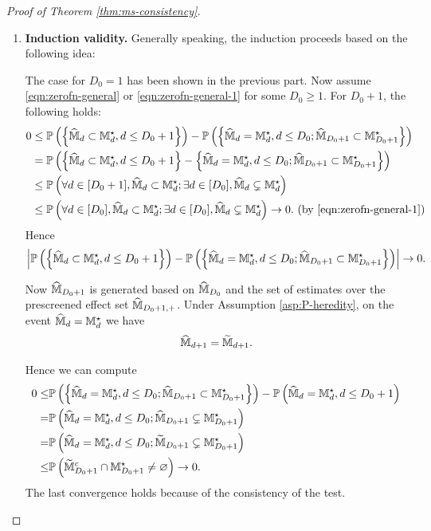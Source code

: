 \documentclass[12pt]{article}
\begin{document}
{\begin{proof}[Proof of Theorem \ref{thm:ms-consistency}]
\begin{enumerate}
    
    
    \item \textbf{Induction validity.}
    Generally speaking, the induction proceeds based on the following idea:
    

    
    The case for $D_0=1$ has been shown in the previous part. Now assume \eqref{eqn:zerofn-general} or \eqref{eqn:zerofn-general-1} for some $D_0\ge1$.  For $D_0+1$, 
    the following holds:
    \begin{align*} 
        0&\le {\mathbb{P}}\left(\left\{\widehat{{\mathbb{M}}}_d\subset{\mathbb{M}}^\star_d, d\le D_0+1\right\}\right)-{\mathbb{P}}\left(\left\{\widehat{{\mathbb{M}}}_d={\mathbb{M}}^\star_d, d\le D_0; \widehat{{\mathbb{M}}}_{D_0+1}\subset{\mathbb{M}}^\star_{D_0+1}\right\}\right) \\
        &= {\mathbb{P}}\left(\left\{\widehat{{\mathbb{M}}}_d\subset{\mathbb{M}}^\star_d, d\le D_0+1\right\} - \left\{\widehat{{\mathbb{M}}}_d={\mathbb{M}}^\star_d, d\le D_0; \widehat{{\mathbb{M}}}_{D_0+1}\subset{\mathbb{M}}^\star_{D_0+1}\right\}\right)\notag\\
        &\le {\mathbb{P}}\left(\forall d\in[D_0+1], \widehat{{\mathbb{M}}}_{d}\subset{\mathbb{M}}^\star_{d}; \exists d\in[D_0], \widehat{{\mathbb{M}}}_d\subsetneq{\mathbb{M}}^\star_d\right)\notag\\
        &\le {\mathbb{P}}\left(\forall d\in[D_0], \widehat{{\mathbb{M}}}_{d}\subset{\mathbb{M}}^\star_{d};\exists d\in[D_0], \widehat{{\mathbb{M}}}_d\subsetneq{\mathbb{M}}^\star_d\right)\to 0.\text{ (by \eqref{eqn:zerofn-general-1})}
    \end{align*}
    Hence
    \begin{align}\label{eqn:zerofun-general-2}
        \left|{\mathbb{P}}\left(\left\{\widehat{{\mathbb{M}}}_d\subset{\mathbb{M}}^\star_d, d\le D_0+1\right\}\right) - 
        {\mathbb{P}}\left(\left\{\widehat{{\mathbb{M}}}_d={\mathbb{M}}^\star_d, d\le D_0; \widehat{{\mathbb{M}}}_{D_0+1}\subset{\mathbb{M}}^\star_{D_0+1}\right\}\right)\right| \to 0.
    \end{align}
    
    Now $\widehat{{\mathbb{M}}}_{D_0+1}$ is generated based on $\widehat{{\mathbb{M}}}_{D_0}$ and the set of estimates over the prescreened effect set  $\widehat{{\mathbb{M}}}_{D_0+1,+}$. Under Assumption \ref{asp:P-heredity}, on the event $\widehat{{\mathbb{M}}}_d = {\mathbb{M}}_d^\star$ we have
    \begin{align*}
        \widehat{{\mathbb{M}}}_{d+1} = \widetilde{{\mathbb{M}}}_{d+1}.
    \end{align*}
    
    Hence we can compute
    \begin{align*}
        0\le& {\mathbb{P}}\left(\left\{\widehat{{\mathbb{M}}}_d={\mathbb{M}}^\star_d, d\le D_0; \widehat{{\mathbb{M}}}_{D_0+1}\subset{\mathbb{M}}^\star_{D_0+1}\right\}\right) - {\mathbb{P}}\left(\widehat{{\mathbb{M}}}_d={\mathbb{M}}^\star_d, d\le D_0+1\right)\\
        = & {\mathbb{P}}\left(\widehat{{\mathbb{M}}}_d={\mathbb{M}}^\star_d, d\le D_0; \widehat{{\mathbb{M}}}_{D_0+1}\subsetneq {\mathbb{M}}^{\star }_{D_0+1}\right) \\
        = & {\mathbb{P}}\left(\widehat{{\mathbb{M}}}_d={\mathbb{M}}^\star_d, d\le D_0; \widetilde{{\mathbb{M}}}_{D_0+1}\subsetneq {\mathbb{M}}^{\star }_{D_0+1}\right) \\
        \le&  {\mathbb{P}}\left(\widetilde{{\mathbb{M}}}^c_{D_0+1}\cap{\mathbb{M}}^{\star }_{D_0+1}\neq\varnothing\right)\to 0.
    \end{align*}
   The last convergence holds  because of the consistency of the test.
    

\end{enumerate}
\end{proof}}
\end{document}
